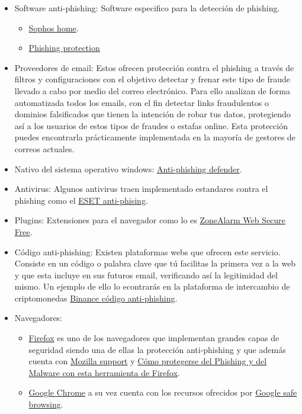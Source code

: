 \documentclass[
  spanish,
  a4paper,
  openany]{book}
\begin{document}
\begin{itemize}
\item
  Software anti-phishing: Software especifico para la detección de phishing.

  \begin{itemize}
  \item
    \href{https://home.sophos.com/es-es.aspx}{Sophos home}.
  \item
    \href{https://www.phishprotection.com/}{Phishing protection}
  \end{itemize}
\item
  Proveedores de email: Estos ofrecen protección contra el phishing a través de filtros y configuraciones con el objetivo detectar y frenar este tipo de fraude llevado a cabo por medio del correo electrónico. Para ello analizan de forma automatizada todos los emails, con el fin detectar links fraudulentos o dominios falsificados que tienen la intención de robar tus datos, protegiendo así a los usuarios de estos tipos de fraudes o estafas online. Esta protección puedes encontrarla prácticamente implementada en la mayoría de gestores de correos actuales.
\item
  Nativo del sistema operativo windows: \href{https://docs.microsoft.com/es-es/office365/servicedescriptions/office-365-advanced-threat-protection-service-description}{Anti-phishing defender}.
\item
  Antivirus: Algunos antivirus traen implementado estandares contra el phishing como el \href{https://support.eset.com/es/kb6380-activar-anti-phishing-en-productos-para-android-de-eset\#enable}{ESET anti-phising}.
\item
  Plugins: Extensiones para el navegador como lo es \href{https://www.zonealarm.com/es/anti-phishing/}{ZoneAlarm Web Secure Free}.
\item
  Código anti-phishing: Existen plataformas webs que ofrecen este servicio. Consiste en un código o palabra clave que tú facilitas la primera vez a la web y que esta incluye en sus futuros email, verificando así la legitimidad del mismo. Un ejemplo de ello lo econtrarás en la plataforma de intercambio de criptomonedas \href{https://academy.binance.com/es/articles/anti-phishing-code}{Binance código anti-phishing}.
\item
  Navegadores:

  \begin{itemize}
  \item
    \href{https://www.mozilla.org/es-ES/firefox/}{Firefox} es uno de los navegadores que implementan grandes capas de seguridad siendo una de ellas la protección anti-phishing y que además cuenta con \href{https://support.mozilla.org/es/}{Mozilla support} y \href{https://support.mozilla.org/es/kb/como-protegerse-del-phishing-y-del-malware-con-esta-herramienta-firefox}{Cómo protegerse del Phishing y del Malware con esta herramienta de Firefox}.
  \item
    \href{https://www.google.com/intl/es/chrome/}{Google Chrome} a su vez cuenta con los recursos ofrecidos por \href{https://safebrowsing.google.com/}{Google safe browsing}.
  \end{itemize}
\end{itemize}
\end{document}
